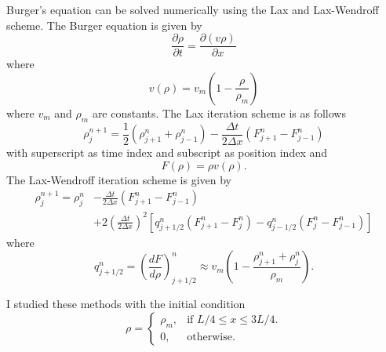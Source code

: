 Burger's equation can be solved numerically using the Lax and Lax-Wendroff scheme.
The Burger equation is given by
\begin{equation}
\frac{\partial \rho}{\partial t} = \frac{\partial (v \rho)}{\partial x}
\end{equation}
where
\begin{equation}
v(\rho) = v_m \left(1-\frac{\rho}{\rho_m}\right)
\end{equation}
where $v_m$ and $\rho_m$ are constants.
The Lax iteration scheme is as follows
\begin{equation}
\rho_{j}^{n+1} = \frac{1}{2} \left( \rho_{j+1}^{n} + \rho_{j-1}^{n} \right)
- \frac{\Delta t}{2 \Delta x} \left( F_{j+1}^{n} - F_{j-1}^{n} \right) 
\end{equation}
with superscript as time index and subscript as position index and 
\begin{equation}\label{eq:exc2_F}
F(\rho) = \rho v(\rho).
\end{equation}
The Lax-Wendroff iteration scheme is given by
\begin{equation}\label{eq:exc2_LWscheme}
\begin{split}
\rho_{j}^{n+1} = \rho_{j}^{n} &- \frac{\Delta t}{2 \Delta x} \left( F_{j+1}^{n} - F_{j-1}^{n} \right) \\
&+ 2 \left(\frac{\Delta t}{2 \Delta x}\right)^2   \left[ q_{j+1/2}^{n}(F_{j+1}^{n} - F_{j}^{n})
- q_{j-1/2}^{n}(F_{j}^{n} - F_{j-1}^{n}) \right]
\end{split}
\end{equation}
where 
\begin{equation}
q_{j+1/2}^{n} = \left(\frac{dF}{d\rho}\right)^{n}_{j+1/2} \approx 
v_m \left(1-\frac{\rho_{j+1}^{n}+\rho_{j}^{n}}{\rho_m}\right).
\end{equation}

I studied these methods with the initial condition
\begin{equation}
\rho = 
	\begin{cases}
    	\rho_m, & \text{if $L/4 \le x \le 3L/4$}.\\
    	0, 		& \text{otherwise}.
  	\end{cases}
\end{equation}

